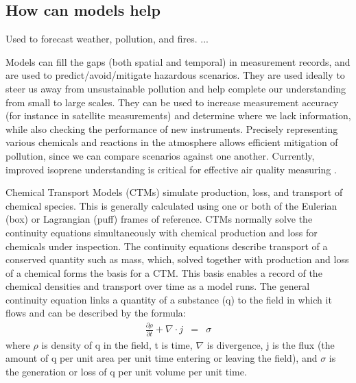   \subsection{How can models help}
    Used to forecast weather, pollution, and fires. ...
    
    Models can fill the gaps (both spatial and temporal) in measurement records, and are used to predict/avoid/mitigate hazardous scenarios.
    They are used ideally to steer us away from unsustainable pollution and help complete our understanding from small to large scales.
    They can be used to increase measurement accuracy (for instance in satellite measurements) and determine where we lack information, while also checking the performance of new instruments.
    Precisely representing various chemicals and reactions in the atmosphere allows efficient mitigation of pollution, since we can compare scenarios against one another.
    Currently, improved isoprene understanding is critical for effective air quality measuring \citep{Marvin2017}.
    
    Chemical Transport Models (CTMs) simulate production, loss, and transport of chemical species.
    This is generally calculated using one or both of the Eulerian (box) or Lagrangian (puff) frames of reference.
    CTMs normally solve the continuity equations simultaneously with chemical production and loss for chemicals under inspection. 
    The continuity equations describe transport of a conserved quantity such as mass, which, solved together with production and loss of a chemical forms the basis for a CTM.
    This basis enables a record of the chemical densities and transport over time as a model runs.
    The general continuity equation links a quantity of a substance (q) to the field in which it flows and can be described by the formula:
    \begin{eqnarray*}
      \frac{\partial \rho}{\partial t} + \nabla \cdot j &=& \sigma 
    \end{eqnarray*}
    where $\rho$ is density of q in the field, t is time, $\nabla$ is divergence, j is the flux (the amount of q per unit area per unit time entering or leaving the field), and $\sigma$ is the generation or loss of q per unit volume per unit time.
    
